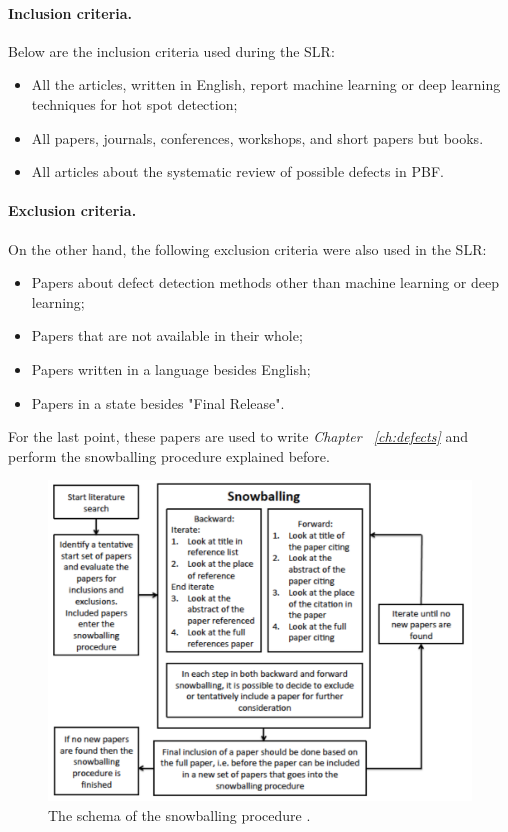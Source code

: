 \paragraph{Inclusion criteria.} Below are the inclusion criteria used during the SLR:
\begin{itemize}
    \item All the articles, written in English, report machine learning or deep learning techniques for  hot spot detection;
    \item All papers, journals, conferences, workshops, and short papers but books.
    \item All articles about the systematic review of possible defects in PBF.
\end{itemize}
\paragraph{Exclusion criteria.} On the other hand, the following exclusion criteria were also used in the SLR:
\begin{itemize}
    \item Papers about defect detection methods other than machine learning or deep learning;
    \item Papers that are not available in their whole;
    \item Papers written in a language besides English;
    \item Papers in a state besides "Final Release".
\end{itemize}

For the last point, these papers are used to write \emph{Chapter ~\ref{ch:defects}} and perform the snowballing procedure explained before.

\begin{figure}
    \centering
    \includegraphics[scale=0.25]{Images/pallinadicoca.png}
    \caption[Snowballing procedure.] {The schema of the snowballing procedure \cite{wohlin_guidelines_2014}.}
    \label{fig:pallinacoca}
\end{figure}